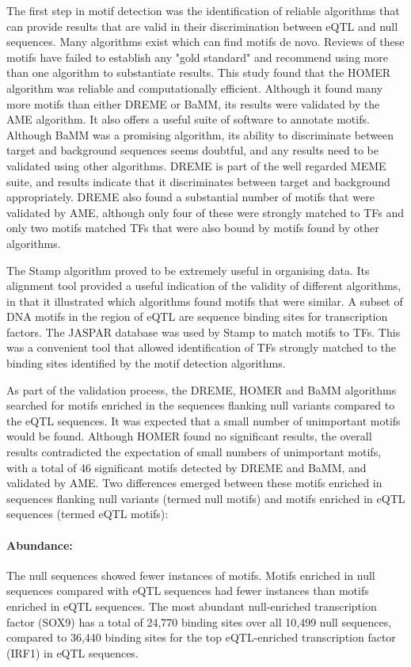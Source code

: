 \documentclass[12pt]{article}
\begin{document}
The first step in motif detection was the identification of reliable algorithms that can provide results that are valid in their discrimination between eQTL and null sequences. Many algorithms exist which can find motifs de novo. Reviews of these motifs have failed to establish any "gold standard" and \citet{tran2014survey} recommend using more than one algorithm to substantiate results. This study found that the HOMER algorithm was reliable and computationally efficient. Although it found many more motifs than either DREME or BaMM, its results were validated by the AME algorithm. It also offers a useful suite of software to annotate motifs. Although BaMM was a promising algorithm, its ability to discriminate between target and background sequences seems doubtful, and any results need to be validated using other algorithms. DREME is part of the well regarded MEME suite, and results indicate that it discriminates between target and background appropriately. DREME also found a substantial number of motifs that were validated by AME, although only four of these were strongly matched to TFs and only two motifs matched TFs that were also bound by motifs found by other algorithms.

The Stamp algorithm proved to be extremely useful in organising data. Its alignment tool provided a useful indication of the validity of different algorithms, in that it illustrated which algorithms found motifs that were similar. A subset of DNA motifs in the region of eQTL are sequence binding sites for transcription factors. The JASPAR database \citep{Mathelier2016} was used by Stamp to match motifs to TFs. This was a convenient tool that allowed identification of TFs strongly matched to the binding sites identified by the motif detection algorithms. 

As part of the validation process, the DREME, HOMER and BaMM algorithms searched for motifs enriched in the sequences flanking null variants compared to the eQTL sequences. It was expected that a small number of unimportant motifs would be found. Although HOMER found no significant results, the overall results contradicted the expectation of small numbers of unimportant motifs, with a total of 46 significant motifs detected by DREME and BaMM, and validated by AME. Two differences emerged between these motifs enriched in sequences flanking null variants (termed null motifs) and motifs enriched in eQTL sequences (termed eQTL motifs):
\paragraph{Abundance:} 
The null sequences showed fewer instances of motifs. Motifs enriched in null sequences compared with eQTL sequences had fewer instances than motifs enriched in eQTL sequences. The most abundant null-enriched transcription factor (SOX9) has a total of 24,770 binding sites over all 10,499 null sequences, compared to 36,440 binding sites for the top eQTL-enriched transcription factor (IRF1) in eQTL sequences. 
\end{document}
